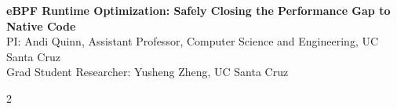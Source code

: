 \documentclass[11pt]{article}
\begin{document}
\setcounter{page}{1}

\begin{center}
{\large \textbf{eBPF Runtime Optimization: Safely Closing the Performance Gap to Native Code}}\\[0.4em]
PI: Andi Quinn, Assistant Professor, Computer Science and Engineering, UC Santa Cruz\\
Grad Student Researcher: Yusheng Zheng, UC Santa Cruz
\end{center}


% 
% 
% 
% 
% 

\vspace{-4mm}
\renewcommand{\refname}{}
\let\OLDthebibliography\thebibliography
\renewcommand\thebibliography[1]{
  \OLDthebibliography{#1}
  \setlength{\parskip}{0pt}
  \setlength{\itemsep}{0pt plus 0.2ex}
}
{\tiny
\setlength{\columnsep}{8pt}
\begin{multicols}{2}

\end{multicols}
}

%
\end{document}
